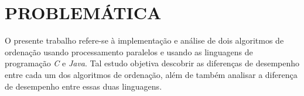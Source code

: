 \section{\normalsize PROBLEMÁTICA}
	O presente trabalho refere-se à implementação e análise de dois algoritmos de ordenação usando processamento paralelos e usando as linguagens de programação \textit{C} e \textit{Java}. Tal estudo objetiva  descobrir as diferenças de desempenho entre cada um dos algoritmos de ordenação, além de também analisar a diferença de desempenho entre essas duas linguagens.
